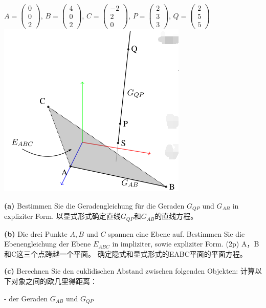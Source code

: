 \documentclass[fleqn]{article}
\begin{document}
$A=\begin{pmatrix}
    0\\0\\2
\end{pmatrix},\,B=\begin{pmatrix}
    4\\0\\2
\end{pmatrix},\,C=\begin{pmatrix}
    -2\\2\\0
\end{pmatrix},\,P=\begin{pmatrix}
    2\\3\\3
\end{pmatrix},\,Q=\begin{pmatrix}
    2\\5\\5
\end{pmatrix}$
\includegraphics[scale=0.5]{10.png}

\indent\textbf{(a)} Bestimmen Sie die Geradengleichung für die Geraden $G_{QP}$ und $G_{AB}$ in expliziter Form.
以显式形式确定直线$G_{QP}$和$G_{AB}$的直线方程。

\indent\textbf{(b)} Die drei Punkte $A,B$ und $C$ spannen eine Ebene auf. Bestimmen Sie die Ebenengleichung der Ebene $E_{ABC}$ in impliziter, sowie expliziter Form. (2p)
A，B和C这三个点跨越一个平面。 确定隐式和显式形式的EABC平面的平面方程。

\indent\textbf{(c)} Berechnen Sie den euklidischen Abstand zwischen folgenden Objekten:
计算以下对象之间的欧几里得距离：

\indent\indent- der Geraden $G_{AB}$ und $G_{QP}$ 
\end{document}
